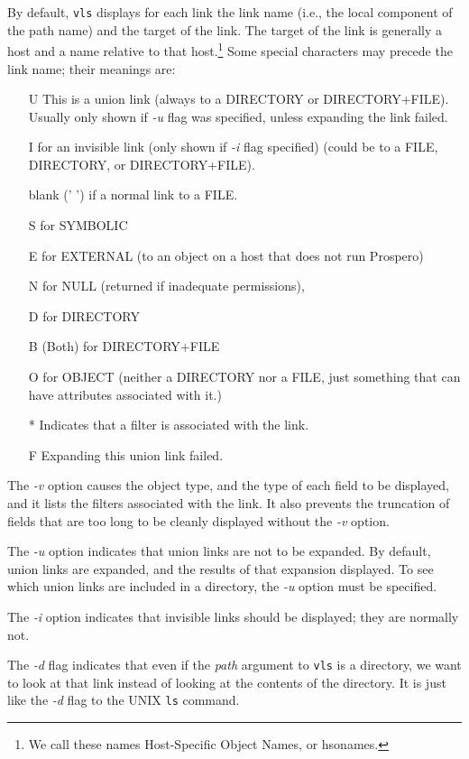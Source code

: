 By default, {\tt vls} displays for each link the link name (i.e., the
local component of the path name)  and the target of the link.  The
target of the link is generally a host and a name relative to that
host.\footnote{
	We call these names Host-Specific Object Names, or {\sc hsoname}s.}
Some special characters may precede the link name; their meanings are:
\begin{itemize}
\item[U] This is a union link (always to a DIRECTORY or
DIRECTORY+FILE).  Usually only shown if {\it -u} flag was specified,
unless expanding the link failed.
\item[I] for an invisible link (only shown if {\it -i} flag specified)
	(could be to a FILE, DIRECTORY, or DIRECTORY+FILE).
\item[blank (' ')] if a normal link to a FILE.
\item[S] for SYMBOLIC
\item[E] for EXTERNAL (to an object on a host that does not run
Prospero)
\item[N] for NULL (returned if inadequate permissions),
\item[D] for DIRECTORY
\item[B] (Both) for DIRECTORY+FILE
\item[O] for OBJECT (neither a DIRECTORY nor a FILE, just something
that can have attributes associated with it.)
\item[*] Indicates that a filter is associated with the
link.
\item[F] Expanding this union link failed.
\end{itemize}

The {\em -v} option causes the object type, and the type of each field
to be displayed, and it lists the filters associated with the link.
It also prevents the truncation of fields that are too long to be
cleanly displayed without the {\em -v} option.

The {\em -u} option indicates that union links are not to be expanded.
By default, union links are expanded, and the results of that
expansion displayed.  To see which union links are included in a
directory, the {\em -u} option must be specified.

The {\em -i} option indicates that invisible links should be
displayed; they are normally not.

The {\em -d} flag indicates that even if the {\it path} argument to
{\tt vls} is a directory, we want to look at that link instead of
looking at the contents of the directory.  It is just like the {\it
-d} flag to the UNIX {\tt ls} command.

